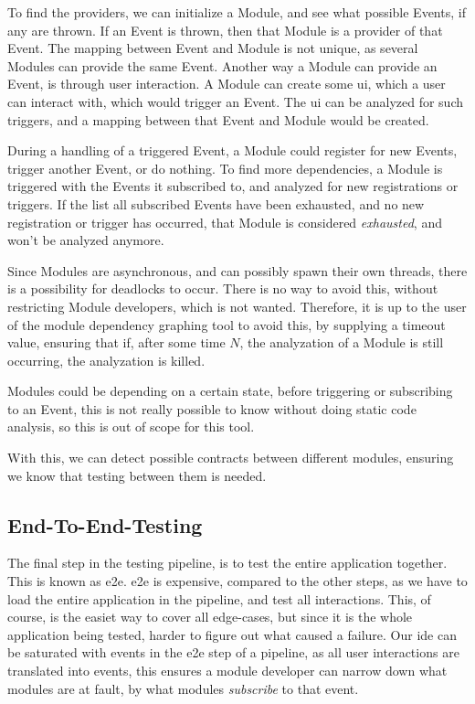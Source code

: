 To find the providers, we can initialize a Module, and see what possible
Events, if any are thrown. If an Event is thrown, then that Module is a
provider of that Event. The mapping between Event and Module is not unique,
as several Modules can provide the same Event. Another way a Module can
provide an Event, is through user interaction. A Module can create some
\gls*{ui}, which a user can interact with, which would trigger an Event. The
\gls*{ui} can be analyzed for such triggers, and a mapping between that Event and
Module would be created.

During a handling of a triggered Event, a Module could register for new
Events, trigger another Event, or do nothing. To find more dependencies, a
Module is triggered with the Events it subscribed to, and analyzed for new
registrations or triggers. If the list all subscribed Events have been
exhausted, and no new registration or trigger has occurred, that Module is
considered \textit{exhausted}, and won't be analyzed anymore.

Since Modules are asynchronous, and can possibly spawn their own threads, there
is a possibility for deadlocks to occur. There is no way to avoid this, without
restricting Module developers, which is not wanted. Therefore, it is up to
the user of the module dependency graphing tool to avoid this, by supplying a
timeout value, ensuring that if, after some time $N$, the analyzation of a
Module is still occurring, the analyzation is killed.

Modules could be depending on a certain state, before triggering or
subscribing to an Event, this is not really possible to know without doing
static code analysis, so this is out of scope for this tool.

With this, we can detect possible contracts between different modules, ensuring
we know that testing between them is needed.

\subsection{End-To-End-Testing}

The final step in the testing pipeline, is to test the entire application
together. This is known as \gls*{e2e}. \gls*{e2e} is expensive, compared to the
other steps, as we have to load the entire application in the pipeline, and test
all interactions. This, of course, is the easiet way to cover all edge-cases, but
since it is the whole application being tested, harder to figure out what caused
a failure. Our \gls*{ide} can be saturated with events in the \gls*{e2e} step of a
pipeline, as all user interactions are translated into events, this ensures a
module developer can narrow down what modules are at fault, by what modules
\textit{subscribe} to that event.

